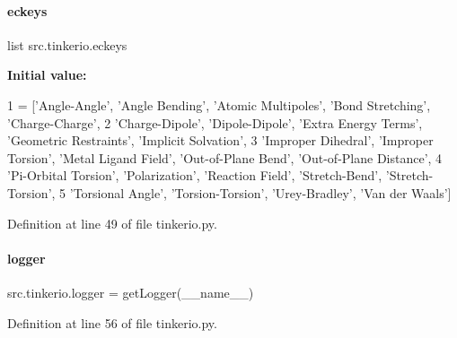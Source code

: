 \paragraph{\texorpdfstring{eckeys}{eckeys}}
{\footnotesize\ttfamily list src.\+tinkerio.\+eckeys}

{\bfseries Initial value\+:}
\begin{DoxyCode}
1 =  [\textcolor{stringliteral}{'Angle-Angle'}, \textcolor{stringliteral}{'Angle Bending'}, \textcolor{stringliteral}{'Atomic Multipoles'}, \textcolor{stringliteral}{'Bond Stretching'}, \textcolor{stringliteral}{'Charge-Charge'}, 
2           \textcolor{stringliteral}{'Charge-Dipole'}, \textcolor{stringliteral}{'Dipole-Dipole'}, \textcolor{stringliteral}{'Extra Energy Terms'}, \textcolor{stringliteral}{'Geometric Restraints'}, \textcolor{stringliteral}{'Implicit
       Solvation'}, 
3           \textcolor{stringliteral}{'Improper Dihedral'}, \textcolor{stringliteral}{'Improper Torsion'}, \textcolor{stringliteral}{'Metal Ligand Field'}, \textcolor{stringliteral}{'Out-of-Plane Bend'}, \textcolor{stringliteral}{'Out-of-Plane
       Distance'}, 
4           \textcolor{stringliteral}{'Pi-Orbital Torsion'}, \textcolor{stringliteral}{'Polarization'}, \textcolor{stringliteral}{'Reaction Field'}, \textcolor{stringliteral}{'Stretch-Bend'}, \textcolor{stringliteral}{'Stretch-Torsion'}, 
5           \textcolor{stringliteral}{'Torsional Angle'}, \textcolor{stringliteral}{'Torsion-Torsion'}, \textcolor{stringliteral}{'Urey-Bradley'}, \textcolor{stringliteral}{'Van der Waals'}]
\end{DoxyCode}


Definition at line 49 of file tinkerio.\+py.

\mbox{\label{namespacesrc_1_1tinkerio_ae4bc471e9f9ecfced2b990ffa2b781aa}} 
\paragraph{\texorpdfstring{logger}{logger}}
{\footnotesize\ttfamily src.\+tinkerio.\+logger = get\+Logger(\+\_\+\+\_\+name\+\_\+\+\_\+)}



Definition at line 56 of file tinkerio.\+py.

\mbox{\label{namespacesrc_1_1tinkerio_aba760bdf570ad66c513d1ab4b2888cc1}} 
